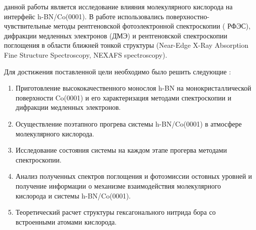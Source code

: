 {\aim} данной работы является исследование влияния молекулярного кислорода на 
интерфейс h-BN/Co(0001). В работе использовались поверхностно-чувствительные методы рентгеновской фотоэлектронной спектроскопии (
РФЭС), дифракции медленных электронов (ДМЭ) и рентгеновской 
спектроскопии поглощения в области ближней тонкой структуры (Near-Edge 
X-Ray Absorption Fine Structure Spectroscopy, NEXAFS
spectroscopy). 


Для достижения поставленной цели необходимо было решить следующие {\tasks}:
\vspace{15pt}
\begin{enumerate}
  \item Приготовление высококачественного монослоя h-BN на
  монокристаллической поверхности Co(0001) и его характеризация 
  методами спектроскопии и дифракции медленных электронов.
  \item Осуществление поэтапного прогрева системы h-BN/Co(0001) в атмосфере молекулярного кислорода.
  \item Исследование состояния системы на каждом этапе прогерва
  методами спектроскопии.
  \item Анализ полученных спектров поглощения и фотоэмиссии 
  остовных уровней и получение информации о механизме 
  взаимодействия молекулярного кислорода и системы h-BN/Co(0001).
  \item Теоретический расчет структуры гексагонального  нитрида бора со встроенными атомами кислорода.
\end{enumerate}
\vspace{15pt}





